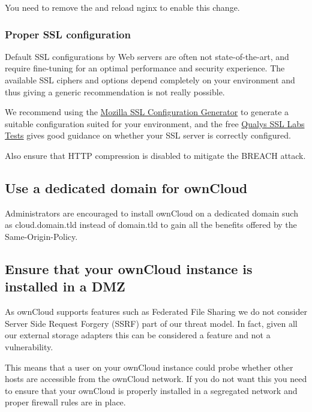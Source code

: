 \documentclass[letterpaper,10pt,english]{sphinxmanual}
\begin{document}
You need to remove the \code{\#} and reload nginx to enable this change.


\subsubsection{Proper SSL configuration}
\label{configuration_server/harden_server:proper-ssl-configuration}
Default SSL configurations by Web servers are often not state-of-the-art, and
require fine-tuning for an optimal performance and security experience. The
available SSL ciphers and options depend completely on your environment and
thus giving a generic recommendation is not really possible.

We recommend using the \href{https://mozilla.github.io/server-side-tls/ssl-config-generator/}{Mozilla SSL Configuration Generator} to generate a
suitable configuration suited for your environment, and the free \href{https://www.ssllabs.com/ssltest/}{Qualys
SSL Labs Tests} gives good guidance on whether your SSL server is correctly
configured.

Also ensure that HTTP compression is disabled to mitigate the BREACH attack.


\subsection{Use a dedicated domain for ownCloud}
\label{configuration_server/harden_server:use-a-dedicated-domain-for-owncloud}
Administrators are encouraged to install ownCloud on a dedicated domain such as
cloud.domain.tld instead of domain.tld to gain all the benefits offered by the
Same-Origin-Policy.


\subsection{Ensure that your ownCloud instance is installed in a DMZ}
\label{configuration_server/harden_server:ensure-that-your-owncloud-instance-is-installed-in-a-dmz}
As ownCloud supports features such as Federated File Sharing we do not consider
Server Side Request Forgery (SSRF) part of our threat model. In fact, given all our
external storage adapters this can be considered a feature and not a vulnerability.

This means that a user on your ownCloud instance could probe whether other hosts
are accessible from the ownCloud network. If you do not want this you need to
ensure that your ownCloud is properly installed in a segregated network and proper
firewall rules are in place.
\end{document}
